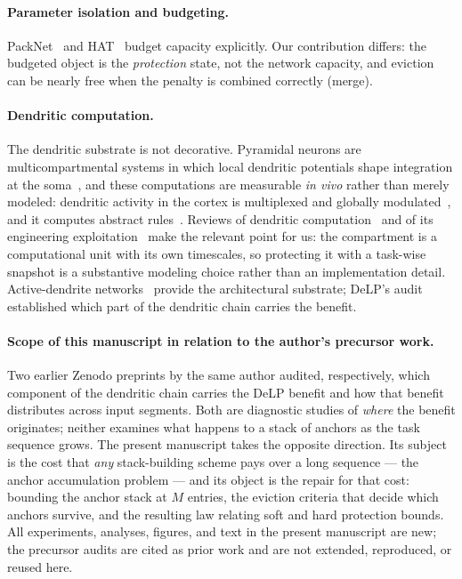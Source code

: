 \documentclass[review,12pt,number]{elsarticle}
\newcommand{\delp}{DeLP}
\begin{document}
\paragraph{Parameter isolation and budgeting.}
PackNet~\cite{mallya2018} and HAT~\cite{serra2018} budget capacity
explicitly. Our contribution differs: the budgeted object is the
\emph{protection} state, not the network capacity, and eviction can
be nearly free when the penalty is combined correctly (merge).

\paragraph{Dendritic computation.}
The dendritic substrate is not decorative. Pyramidal neurons are
multicompartmental systems in which local dendritic potentials shape
integration at the soma~\cite{chang1951,poirazi2003,beniaguev2021}, and
these computations are measurable \emph{in vivo}
rather than merely modeled: dendritic activity in the cortex is
multiplexed and globally modulated~\cite{ujfalussy2018}, and it
computes abstract rules~\cite{zhang2026}. Reviews of dendritic
computation~\cite{london2005,poirazi2020} and of its engineering
exploitation~\cite{cardwell2025,boyle2025,baek2024,boahen2022} make the
relevant point for us: the compartment is a computational unit with its
own timescales, so protecting it with a task-wise snapshot is a
substantive modeling choice rather than an implementation detail.
Active-dendrite networks~\cite{iyer2022,onasch2026} provide the
architectural substrate; \delp{}'s audit~\cite{zhou2026delp}
established which part of the dendritic chain carries the benefit.

\paragraph{Scope of this manuscript in relation to the author's precursor
work.} Two earlier Zenodo preprints by the same author
\cite{zhou2026delp,zhou2026seg} audited, respectively, which component of the
dendritic chain carries the DeLP benefit and how that benefit distributes across
input segments. Both are diagnostic studies of \emph{where} the benefit
originates; neither examines what happens to a stack of anchors as the task
sequence grows. The present manuscript takes the opposite direction. Its
subject is the cost that \emph{any} stack-building scheme pays over a long
sequence --- the anchor accumulation problem --- and its object is the repair
for that cost: bounding the anchor stack at $M$ entries, the eviction criteria
that decide which anchors survive, and the resulting law relating soft and
hard protection bounds. All experiments, analyses, figures, and text in the
present manuscript are new; the precursor audits are cited as prior work and
are not extended, reproduced, or reused here.
\end{document}
